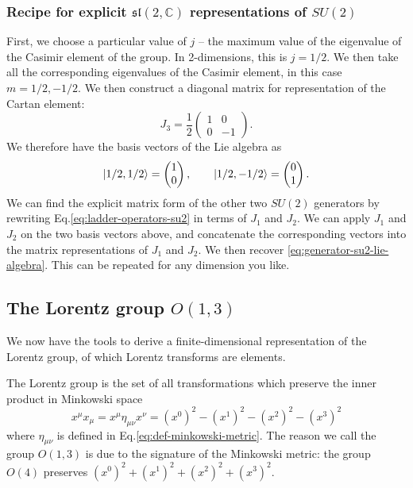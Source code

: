 \documentclass[11pt]{article}
\numberwithin{equation}{section}
\begin{document}
\subsubsection{Recipe for explicit $\mathfrak{sl}(2, \mathbb{C})$ representations of $SU(2)$}

First, we choose a particular value of $j$ -- the maximum value of the eigenvalue of the Casimir element of the group. In 2-dimensions, this is $j=1/2$. We then take all the corresponding eigenvalues of the Casimir element, in this case $m=1/2, -1/2$. We then construct a diagonal matrix for representation of the Cartan element:
\begin{equation}
J_3 = \frac{1}{2}\begin{pmatrix}
1 & 0 \\
0 & -1
\end{pmatrix}.
\end{equation}
We therefore have the basis vectors of the Lie algebra as
\begin{equation}
\ket{1/2, 1/2} = \begin{pmatrix}
1 \\
0
\end{pmatrix}, \qquad \ket{1/2, -1/2} = \begin{pmatrix}
0 \\
1
\end{pmatrix}.
\end{equation}
We can find the explicit matrix form of the other two $SU(2)$ generators by rewriting Eq.\eqref{eq:ladder-operators-su2} in terms of $J_1$ and $J_2$. We can apply $J_1$ and $J_2$ on the two basis vectors above, and concatenate the corresponding vectors into the matrix representations of $J_1$ and $J_2$. We then recover \eqref{eq:generator-su2-lie-algebra}. This can be repeated for any dimension you like.

\subsection{The Lorentz group $O(1,3)$}

We now have the tools to derive a finite-dimensional representation of the Lorentz group, of which Lorentz transforms are elements.

The Lorentz group is the set of all transformations which preserve the inner product in Minkowski space 
\begin{equation}
x^\mu x_\mu = x^\mu \eta_{\mu \nu} x^\nu = (x^0)^2 - (x^1)^2 - (x^2)^2 - (x^3)^2
\end{equation}
where $\eta_{\mu \nu}$ is defined in Eq.\eqref{eq:def-minkowski-metric}. The reason we call the group $O(1,3)$ is due to the signature of the Minkowski metric: the group $O(4)$ preserves $(x^0)^2 + (x^1)^2 + (x^2)^2 + (x^3)^2$. 
\end{document}
